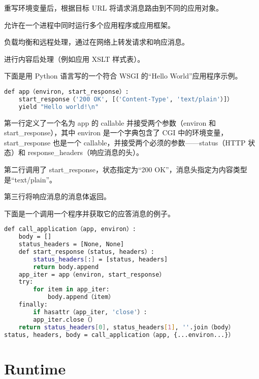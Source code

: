 \begin{compactitem}
\item 重写环境变量后，根据目标 URL 将请求消息路由到不同的应用对象。
\item 允许在一个进程中同时运行多个应用程序或应用框架。
\item 负载均衡和远程处理，通过在网络上转发请求和响应消息。
\item 进行内容后处理（例如应用 XSLT 样式表）。
\end{compactitem}

下面是用 Python 语言写的一个符合 WSGI 的“Hello World”应用程序示例。



\begin{lstlisting}[language=bash]
def app（environ, start_response）:
	start_response（'200 OK', [（'Content-Type', 'text/plain'）]）
	yield "Hello world!\n"
\end{lstlisting}


\begin{compactitem}
\item 第一行定义了一个名为 app 的 callable 并接受两个参数（environ 和 start\_response），其中 environ 是一个字典包含了 CGI 中的环境变量，start\_response 也是一个 callable，并接受两个必须的参数——status（HTTP 状态）和 response\_headers（响应消息的头）。
\item 第二行调用了 start\_response，状态指定为“200 OK”，消息头指定为内容类型是“text/plain”。
\item 第三行将响应消息的消息体返回。

\end{compactitem}

下面是一个调用一个程序并获取它的应答消息的例子。

\begin{lstlisting}[language=bash]
def call_application（app, environ）:
	body = []
	status_headers = [None, None]
	def start_response（status, headers）:
		status_headers[:] = [status, headers]
		return body.append
	app_iter = app（environ, start_response）
	try:
		for item in app_iter:
			body.append（item）
	finally:
		if hasattr（app_iter, 'close'）:
		app_iter.close（）
	return status_headers[0], status_headers[1], ''.join（body）
status, headers, body = call_application（app, {...environ...}）
\end{lstlisting}










\chapter{Runtime}




